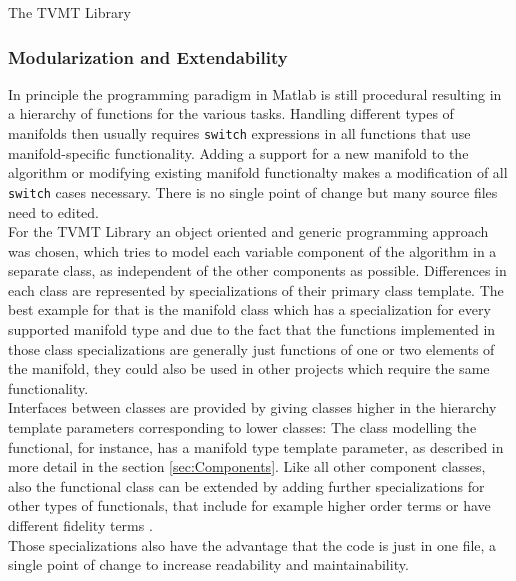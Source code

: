 \begin{chapter}{The TVMT Library}
\subsubsection{Modularization and Extendability} %
\label{ssub:Modularization}
In principle the programming paradigm in Matlab is still procedural resulting in a hierarchy of functions for the various tasks. Handling different types of manifolds
then usually requires \texttt{switch} expressions in all functions that use manifold-specific functionality. Adding a support for a new manifold to the algorithm or modifying
existing manifold functionalty makes a modification of all \texttt{switch} cases necessary. There is no single point of change but many source files need to edited.\\

For the TVMT Library an object oriented and generic programming approach was chosen, which tries to model each variable component of the algorithm in a separate class, as 
independent of the other components as possible. Differences in each class are represented by specializations of their primary class template. The best example for that is the
manifold class which has a specialization for every supported manifold type and due to the fact that the functions implemented in those class specializations are generally
just functions of one or two elements of the manifold, they could also be used in other projects which require the same functionality.\\

Interfaces between classes are provided by giving classes higher in the hierarchy template parameters corresponding to lower classes: The class modelling the functional, for instance,
has a manifold type template parameter, as described in more detail in the section \ref{sec:Components}. Like all other component classes, also the functional class can be extended
by adding further specializations for other types of functionals, that include for example higher order terms or have different fidelity terms \cite{opticalflow}.\\

Those specializations also have the advantage that the code is just in one file, a single point of change to increase readability and maintainability.



\end{chapter}
